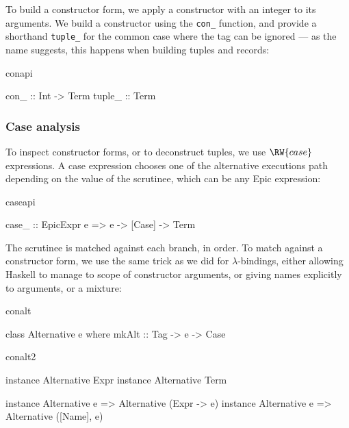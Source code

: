
\noindent
To build a constructor form, we apply a constructor with an integer
 to its arguments. We build a constructor using the
\texttt{con\_} function, and provide a shorthand \texttt{tuple\_} for
the common case where the tag can be ignored --- as the name suggests,
this happens when building tuples and records:

\begin{SaveVerbatim}{conapi}

con_   :: Int -> Term
tuple_ :: Term

\end{SaveVerbatim}

\subsubsection*{Case analysis}

\noindent
To inspect constructor forms, or to deconstruct tuples, we use
$\RW{case}$ expressions. A case expression chooses one of the
alternative executions path depending on the value of the scrutinee,
which can be any Epic expression:

\begin{SaveVerbatim}{caseapi}

case_ :: EpicExpr e => e -> [Case] -> Term

\end{SaveVerbatim}

\noindent
The scrutinee is matched against each branch, in order. To match
against a constructor form, we use the same trick as we did for
$\lambda$-bindings, either allowing Haskell to manage to scope of
constructor arguments, or giving names explicitly to arguments, or a
mixture:

\begin{SaveVerbatim}{conalt}

class Alternative e where
    mkAlt :: Tag -> e -> Case

\end{SaveVerbatim}
\begin{SaveVerbatim}{conalt2}

instance Alternative Expr
instance Alternative Term

instance Alternative e => Alternative (Expr -> e)
instance Alternative e => Alternative ([Name], e)

\end{SaveVerbatim}

